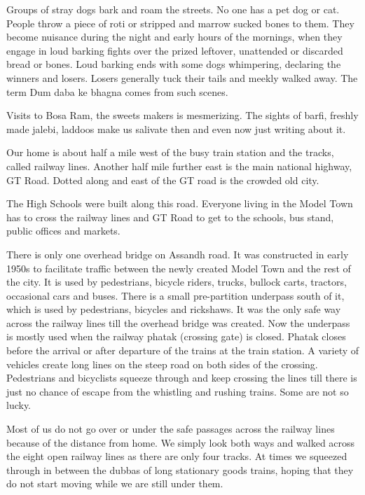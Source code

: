 Groups of stray dogs bark and roam the streets. No one has a pet dog or
cat. People throw a piece of roti or stripped and marrow sucked bones to
them. They become nuisance during the night and early hours of the
mornings, when they engage in loud barking fights over the prized
leftover, unattended or discarded bread or bones. Loud barking ends with
some dogs whimpering, declaring the winners and losers. Losers generally
tuck their tails and meekly walked away. The term Dum daba ke bhagna comes
from such scenes. 

Visits to Bosa Ram, the sweets makers is mesmerizing. The sights of barfi,
freshly made jalebi, laddoos make us salivate then and even now just
writing about it. 

Our home is about half a mile west of the busy train station and the
tracks, called railway lines. Another half mile further east is the main
national highway, GT Road. Dotted along and east of the GT road is the
crowded old city. 

The High Schools were built along this road. Everyone living in the Model
Town has to cross the railway lines and GT Road to get to the schools, bus
stand, public offices and markets. 

There is only one overhead bridge on Assandh road. It was constructed in
early 1950s to facilitate traffic between the newly created Model Town and
the rest of the city. It is used by pedestrians, bicycle riders, trucks,
bullock carts, tractors, occasional cars and buses. There is a small
pre-partition underpass south of it, which is used by pedestrians,
bicycles and rickshaws. It was the only safe way across the railway lines
till the overhead bridge was created. Now the underpass is mostly used
when the railway phatak (crossing gate) is closed. Phatak closes before
the arrival or after departure of the trains at the train station.
A variety of vehicles create long lines on the steep road on both sides of
the crossing. Pedestrians and bicyclists squeeze through and keep crossing
the lines till there is just no chance of escape from the whistling and
rushing trains. Some are not so lucky. 

Most of us do not go over or under the safe passages across the railway
lines because of the distance from home. We simply look both ways and
walked across the eight open railway lines as there are only four tracks.
At times we squeezed through in between the dubbas of long stationary
goods trains, hoping that they do not start moving while we are still
under them. 

